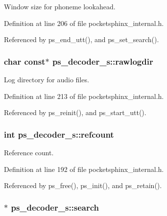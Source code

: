 Window size for phoneme lookahead. 



Definition at line 206 of file pocketsphinx\+\_\+internal.\+h.



Referenced by ps\+\_\+end\+\_\+utt(), and ps\+\_\+set\+\_\+search().

\subsubsection[{rawlogdir}]{\setlength{\rightskip}{0pt plus 5cm}char const$\ast$ ps\+\_\+decoder\+\_\+s\+::rawlogdir}\label{structps__decoder__s_aa2610c52a9267ee18ca095169bf34bfd}


Log directory for audio files. 



Definition at line 213 of file pocketsphinx\+\_\+internal.\+h.



Referenced by ps\+\_\+reinit(), and ps\+\_\+start\+\_\+utt().

\subsubsection[{refcount}]{\setlength{\rightskip}{0pt plus 5cm}int ps\+\_\+decoder\+\_\+s\+::refcount}\label{structps__decoder__s_aa5ab90180288b6c9039eb86b496f76aa}


Reference count. 



Definition at line 192 of file pocketsphinx\+\_\+internal.\+h.



Referenced by ps\+\_\+free(), ps\+\_\+init(), and ps\+\_\+retain().

\subsubsection[{search}]{$\ast$ ps\+\_\+decoder\+\_\+s\+::search}\label{structps__decoder__s_ad337270efc93613cf8dd7594f6515799}


